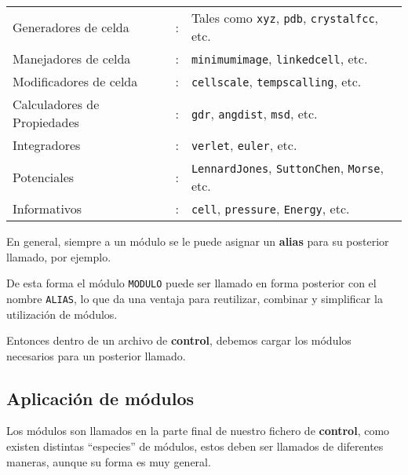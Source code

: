 \begin{tabular}{lcl}
 Generadores de celda & : & Tales como \verb|xyz|, \verb|pdb|, \verb|crystalfcc|, etc. \\
 Manejadores de celda & : &\verb|minimumimage|, \verb|linkedcell|, etc. \\
 Modificadores de celda & : &\verb|cellscale|, \verb|tempscalling|, etc.\\
 Calculadores de Propiedades & : & \verb|gdr|, \verb|angdist|, \verb|msd|, etc. \\
 Integradores & : & \verb|verlet|, \verb|euler|, etc. \\
 Potenciales & : & \verb|LennardJones|, \verb|SuttonChen|, \verb|Morse|, etc. \\
 Informativos & : & \verb|cell|, \verb|pressure|, \verb|Energy|, etc.
\end{tabular}

En general, siempre a un m\'odulo se le puede asignar un \textbf{alias} para su posterior llamado, por ejemplo.


De esta forma el m\'odulo \texttt{MODULO} puede ser llamado en forma posterior con el nombre \texttt{ALIAS}, lo que da una ventaja para reutilizar, combinar y simplificar la utilizaci\'on de m\'odulos.

Entonces dentro de un archivo de \textbf{control}, debemos cargar los m\'odulos necesarios para un posterior llamado.

\subsection{Aplicaci\'on de m\'odulos}

Los m\'odulos son llamados en la parte final de nuestro fichero de \textbf{control}, como existen distintas ``especies'' de m\'odulos, estos deben ser llamados de diferentes maneras, aunque su forma es muy general.

